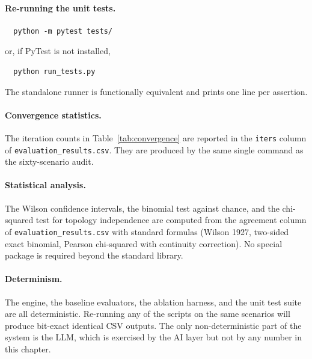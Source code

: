 \paragraph{Re-running the unit tests.}
\begin{verbatim}
  python -m pytest tests/
\end{verbatim}
\noindent or, if PyTest is not installed,
\begin{verbatim}
  python run_tests.py
\end{verbatim}
\noindent The standalone runner is functionally equivalent and prints one line per assertion.

\paragraph{Convergence statistics.}
The iteration counts in Table~\ref{tab:convergence} are reported in the \texttt{iters} column of \texttt{evaluation\_results.csv}. They are produced by the same single command as the sixty-scenario audit.

\paragraph{Statistical analysis.}
The Wilson confidence intervals, the binomial test against chance, and the chi-squared test for topology independence are computed from the agreement column of \texttt{evaluation\_results.csv} with standard formulas (Wilson 1927, two-sided exact binomial, Pearson chi-squared with continuity correction). No special package is required beyond the standard library.

\paragraph{Determinism.} The engine, the baseline evaluators, the ablation harness, and the unit test suite are all deterministic. Re-running any of the scripts on the same scenarios will produce bit-exact identical CSV outputs. The only non-deterministic part of the system is the LLM, which is exercised by the AI layer but not by any number in this chapter.
